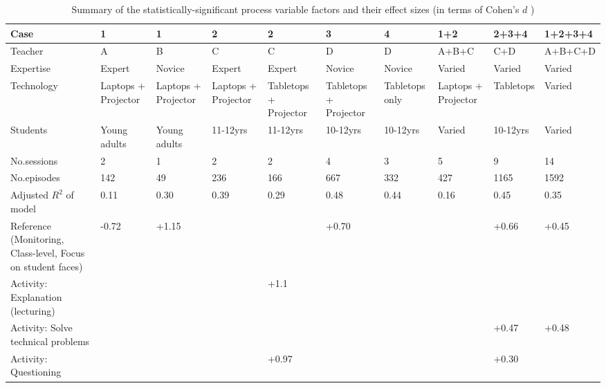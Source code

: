 \documentclass[10pt,journal,compsoc]{IEEEtran}
\begin{document}
\begin{table}[!t]
\caption{Summary of the statistically-significant process variable factors and their effect sizes (in terms of Cohen's $d$ \cite{cohen1977statistical})}
\label{tab:trends}
\centering
\begin{tabular}{|p{3cm}||p{1.2cm}|p{1.2cm}|p{1.2cm}|p{1.2cm}|p{1.2cm}|p{1.2cm}|p{1.2cm}|p{1.2cm}|p{1.2cm}|}
  \hline
Case & 1       & 1       & 2       & 2       & 3       & 4       & 1+2     & 2+3+4   & 1+2+3+4 \\ 
  \hline
  Teacher & A       & B       & C       & C       & D       & D       & A+B+C   & C+D     & A+B+C+D \\ 
  \hline
  Expertise & Expert & Novice & Expert & Expert & Novice & Novice & Varied & Varied & Varied \\ 
  \hline
  Technology & Laptops + Projector   & Laptops + Projector   & Laptops + Projector   & Tabletops + Projector & Tabletops + Projector & Tabletops only      & Laptops + Projector   & Tabletops           & Varied              \\ 
  \hline
  Students & Young adults & Young adults & 11-12yrs     & 11-12yrs     & 10-12yrs     & 10-12yrs     & Varied       & 10-12yrs     & Varied       \\ 
  \hline
  No.sessions &  2 &  1 &  2 &  2 &  4 &  3 &  5 &  9 & 14 \\ 
  \hline
  No.episodes &  142 &   49 &  236 &  166 &  667 &  332 &  427 & 1165 & 1592 \\ 
  \hline
  Adjusted $R^2$ of model & 0.11 & 0.30 & 0.39 & 0.29 & 0.48 & 0.44 & 0.16 & 0.45 & 0.35 \\ 
  \hline
   \hline
  Reference (Monitoring, Class-level, Focus on student faces) & -0.72 &  +1.15 &     &     &  +0.70 &     &     &  +0.66 &  +0.45 \\ 
   \hline
  Activity: Explanation (lecturing) &   &   &   & +1.1 &   &   &   &   &   \\ 
   \hline
  Activity: Solve technical problems &    &    &    &    &    &    &    & +0.47 & +0.48 \\ 
   \hline
  Activity: Questioning &    &    &    & +0.97 &    &    &    & +0.30 &    \\ 

\end{tabular}
\end{table}
\end{document}
